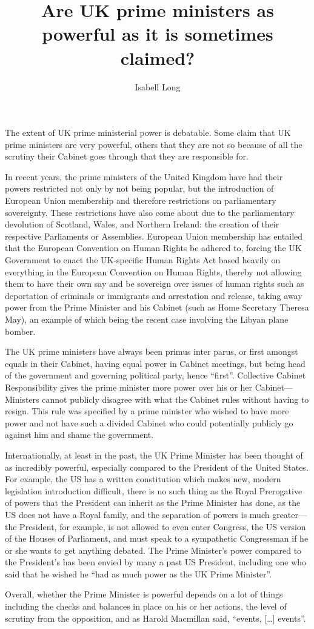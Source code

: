\documentclass[12pt]{article}
\begin{document}
\title{Are UK prime ministers as powerful as it is sometimes claimed?}
\author{Isabell Long}
\maketitle

The extent of UK prime ministerial power is debatable.  Some claim that
UK prime ministers are very powerful, others that they are not so because of
all the scrutiny their Cabinet goes through that they are responsible for. 

In recent years, the prime ministers of the United Kingdom have had their
powers restricted not only by not being popular, but the introduction of
European Union membership and therefore restrictions on parliamentary
sovereignty.  These restrictions have also come about due to the
parliamentary devolution of Scotland, Wales, and Northern Ireland: the
creation of their respective Parliaments or Assemblies.  European Union
membership has entailed that the European Convention on Human Rights be
adhered to, forcing the UK Government to enact the UK-specific Human Rights
Act based heavily on everything in the European Convention on Human Rights,
thereby not allowing them to have their own say and be sovereign over
issues of human rights such as deportation of criminals or immigrants and
arrestation and release, taking away power from the Prime Minister and his
Cabinet (such as Home Secretary Theresa May), an example of which being the recent case
involving the Libyan plane bomber.

The UK prime ministers have always been primus inter parus, or first amongst equals in their
Cabinet, having equal power in Cabinet meetings, but being head of the
government and governing political party, hence ``first''.  Collective
Cabinet Responsibility gives the prime minister more power over his or her
Cabinet---Ministers cannot publicly disagree with what the Cabinet rules
without having to resign.  This rule was specified by a prime minister who
wished to have more power and not have such a divided Cabinet who could
potentially publicly go against him and shame the government.

Internationally, at least in the past, the UK Prime Minister has been
thought of as incredibly powerful, especially compared to the President of
the United States.  For example, the US has a written constitution which
makes new, modern legislation introduction difficult, there is no such
thing as the Royal Prerogative of powers that the President can inherit as
the Prime Minister has done, as the US does not have a Royal family, and
the separation of powers is much greater---the President, for example, is
not allowed to even enter Congress, the US version of the Houses of
Parliament, and must speak to a sympathetic Congressman if he or she wants
to get anything debated.  The Prime Minister's power compared to the
President's has been envied by many a past US President, including one who said that he wished
he ``had as much power as the UK Prime Minister''.  

Overall, whether the Prime Minister is powerful depends on a lot of things
including the checks and balances in place on his or her actions, the
level of scrutiny from the opposition, and as Harold Macmillan said,
``events, [\ldots] events''.
\end{document}
